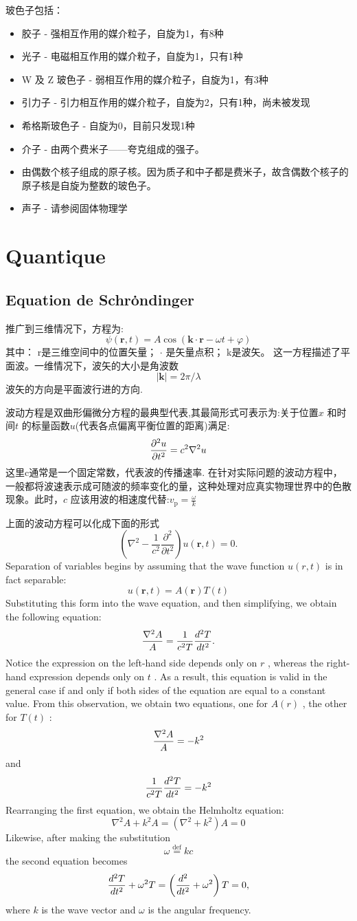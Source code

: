 \documentclass[openany]{book}
\begin{document}
玻色子包括：
\begin{itemize}
\item 胶子 - 强相互作用的媒介粒子，自旋为1，有8种
\item 光子 - 电磁相互作用的媒介粒子，自旋为1，只有1种
\item W 及 Z 玻色子 - 弱相互作用的媒介粒子，自旋为1，有3种
\item 引力子 - 引力相互作用的媒介粒子，自旋为2，只有1种，尚未被发现
\item 希格斯玻色子 - 自旋为0，目前只发现1种
\item 介子 - 由两个费米子——夸克组成的强子。
\item 由偶数个核子组成的原子核。因为质子和中子都是费米子，故含偶数个核子的原子核是自旋为整数的玻色子。
\item 声子 - 请参阅固体物理学
\end{itemize}

\chapter{Quantique}
\section{Equation de Schr\.ondinger}
推广到三维情况下，方程为:
$$
\psi \left({\mathbf r}, t \right) = A \cos \left({\mathbf k} \cdot {\mathbf r} - \omega t + \varphi \right)
$$
其中：
r是三维空间中的位置矢量；
$\cdot$ 是矢量点积；
k是波矢。
这一方程描述了平面波。一维情况下，波矢的大小是角波数
$$|{\mathbf k}| = 2\pi/\lambda$$
波矢的方向是平面波行进的方向.

波动方程是双曲形偏微分方程的最典型代表,其最简形式可表示为:关于位置$x$ 和时间$t$ 的标量函数$u$(代表各点偏离平衡位置的距离)满足:
$$
{ \partial^2 u \over \partial t^2 } = c^2 \nabla^2u
$$
这里c通常是一个固定常数，代表波的传播速率.
在针对实际问题的波动方程中，一般都将波速表示成可随波的频率变化的量，这种处理对应真实物理世界中的色散现象。此时，$ c$  应该用波的相速度代替:$v_\mathrm{p} = \frac{\omega}{k}$

上面的波动方程可以化成下面的形式
$$
\left(\nabla^2-\frac{1}{c^2}\frac{\partial^2}{\partial{t}^2}\right)u(\mathbf{r},t)=0.
$$
Separation of variables begins by assuming that the wave function $u(r, t)$ is in fact separable:
$$u(\mathbf{r},t)=A (\mathbf{r}) T(t)$$
Substituting this form into the wave equation, and then simplifying, we obtain the following equation:
$${\nabla^2 A \over A } = {1 \over c^2 T } { d^2 T \over d t^2  }.$$
Notice the expression on the left-hand side depends only on $ r$ , whereas the right-hand expression depends only on $ t$ . As a result, this equation is valid in the general case if and only if both sides of the equation are equal to a constant value. From this observation, we obtain two equations, one for $ A(r)$ , the other for $ T(t)$ :
$${\nabla^2 A \over A } = -k^2$$
and
$$ {1 \over c^2 T } { d^2 T \over dt^2  } = -k^2$$
Rearranging the first equation, we obtain the Helmholtz equation:
$$\nabla^2 A + k^2 A  =  ( \nabla^2 + k^2)  A  =  0$$
Likewise, after making the substitution
$$ \omega  \stackrel{\mathrm{def}}{=}  kc $$
the second equation becomes
$$\frac{d^2{T}}{d{t}^2} + \omega^2T  =  \left( { d^2 \over dt^2 } + \omega^2 \right) T  =  0,$$
where $k$ is the wave vector and $\omega$ is the angular frequency.
\end{document}
